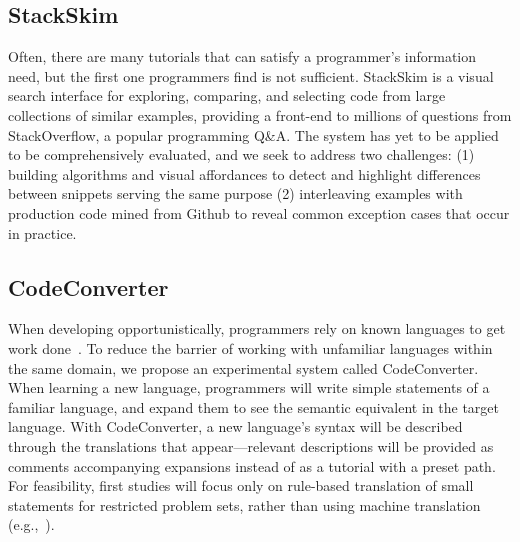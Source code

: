 \documentclass[12pt]{memoir}
\begin{document}
\subsection{StackSkim}
Often, there are many tutorials that can satisfy a programmer's information need, but the first one programmers find is not sufficient.
StackSkim is a visual search interface for exploring, comparing, and selecting code from large collections of similar examples, providing a front-end to millions of questions from StackOverflow, a popular programming Q\&A.
The system has yet to be applied to be comprehensively evaluated, and we seek to address two challenges:
(1) building algorithms and visual affordances to detect and highlight differences between snippets serving the same purpose
(2) interleaving examples with production code mined from Github to reveal common exception cases that occur in practice.

\subsection{CodeConverter}
When developing opportunistically, programmers rely on known languages to get work done~\cite{brandt_opportunistic_2008}.
To reduce the barrier of working with unfamiliar languages within the same domain, we propose an experimental system called CodeConverter.
When learning a new language, programmers will write simple statements of a familiar language, and expand them to see the semantic equivalent in the target language.
With CodeConverter, a new language's syntax will be described through the translations that appear---relevant descriptions will be provided as comments accompanying expansions instead of as a tutorial with a preset path.
For feasibility, first studies will focus only on rule-based translation of small statements for restricted problem sets, rather than using machine translation (e.g.,~\cite{karaivanov_phrase-based_2014}).
\end{document}
